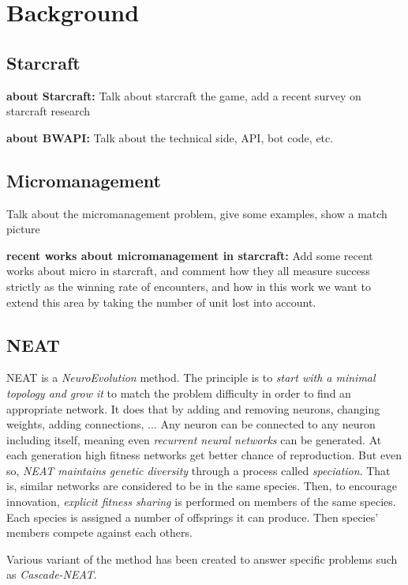 \section{Background}\label{section:background}

\subsection{Starcraft}

{\bf about Starcraft:} Talk about starcraft the game, add a recent
survey on starcraft research

{\bf about BWAPI:} Talk about the technical side, API, bot code, etc.

\subsection{Micromanagement}

Talk about the micromanagement problem, give some examples, show a
match picture

{\bf recent works about micromanagement in starcraft:} Add some recent
works about micro in starcraft, and comment how they all measure
success strictly as the winning rate of encounters, and how in this
work we want to extend this area by taking the number of unit lost
into account.

\subsection{NEAT}\label{subsec:neat}

NEAT is a \emph{NeuroEvolution} method. The principle is to
\emph{start with a minimal topology and grow it} to match the problem
difficulty in order to find an appropriate network.  It does that by
adding and removing neurons, changing weights, adding connections, ...
Any neuron can be connected to any neuron including itself, meaning
even \emph{recurrent neural networks} can be generated.  At each
generation high fitness networks get better chance of
reproduction. But even so, \emph{NEAT maintains genetic diversity}
through a process called \emph{speciation}. That is, similar networks
are considered to be in the same species. Then, to encourage
innovation, \emph{explicit fitness sharing} is performed on members of
the same species. Each species is assigned a number of offsprings it
can produce. Then species' members compete against each
others. \cite{StMi02}

Various variant of the method has been created to answer specific
problems such as \emph{Cascade-NEAT}.

